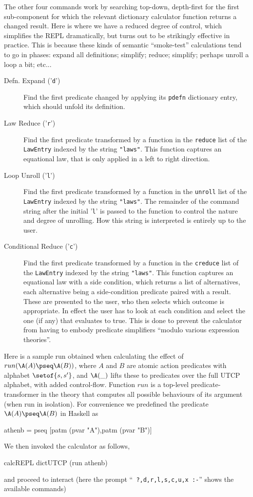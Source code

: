 The other four commands work by searching top-down, depth-first for
the first sub-component for which the relevant dictionary calculator
function returns a changed result.
Here is where we have a reduced degree of control,
which simplifies the REPL dramatically,
but turns out to be strikingly effective in practice.
This is because these kinds of semantic ``smoke-test'' calculations
tend to go in phases: expand all definitions; simplify; reduce; simplify;
perhaps unroll a loop a bit; etc...
\begin{description}
  \item[Defn. Expand ('\texttt{d}')]
    Find the first predicate changed by applying its
     \texttt{pdefn} dictionary entry, which should unfold its definition.
  \item[Law Reduce ('\texttt{r}')]
    Find the first predicate transformed by a function
    in the \texttt{reduce} list of the \texttt{LawEntry} indexed
     by the string \texttt{"laws"}.
     This function captures an equational law,
     that is only applied in a left to right direction.
  \item[Loop Unroll ('\texttt{l}')]
    Find the first predicate transformed by a function
    in the \texttt{unroll} list of the \texttt{LawEntry} indexed
     by the string \texttt{"laws"}.
    The remainder of the command string after the initial '\texttt{l}'
    is passed to the function to control the nature and degree
    of unrolling. How this string is interpreted is entirely
    up to the user.
  \item[Conditional Reduce ('\texttt{c}')]
    Find the first predicate transformed by a function
    in the \texttt{creduce} list of the \texttt{LawEntry} indexed
     by the string \texttt{"laws"}.
     This function captures an equational law with a side condition,
    which returns a list of alternatives,
    each alternative being a side-condition predicate
    paired with a result.
    These are presented to the user,
    who then selects which outcome is appropriate.
    In effect the user has to look at each condition
    and select the one (if any) that evaluates to true.
    This is done to prevent the calculator from having
    to embody predicate simplifiers ``modulo various expression theories''.
\end{description}


Here is a sample run obtained when calculating the effect of $run(\A(A) \pseq \A(B))$,
where $A$ and $B$ are atomic action predicates with alphabet $\setof{s,s'}$,
and $\A(\_)$ lifts these to predicates over the full UTCP alphabet,
with added control-flow.
Function $run$ is a top-level predicate-transformer in the theory that computes
all possible behaviours of its argument (when run in isolation).
For convenience we predefined the predicate $\A(A) \pseq \A(B)$ in Haskell as
\begin{code}
athenb = pseq [patm (pvar "A"),patm (pvar "B")]
\end{code}
We then invoked the calculator as follows,
\begin{code}
calcREPL dictUTCP (run athenb)
\end{code}
and proceed to interact
(here the prompt  ``\texttt{ ?,d,r,l,s,c,u,x :-}''
shows the available commands)

